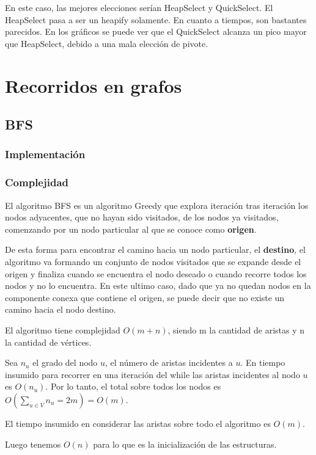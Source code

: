 En este caso, las mejores elecciones serían HeapSelect y QuickSelect. El HeapSelect pasa a ser un heapify solamente. En cuanto a tiempos, son bastantes parecidos. En los gráficos se puede ver que el QuickSelect alcanza un pico mayor que HeapSelect, debido a una mala elección de pivote.

\newpage

\section{Recorridos en grafos}

\subsection{BFS}
\subsubsection{Implementación}

\subsubsection{Complejidad}
El algoritmo BFS es un algoritmo Greedy que explora iteración tras iteración los nodos adyacentes, que no hayan sido visitados, de los nodos ya visitados, comenzando por un nodo particular al que se conoce como \textbf{origen}. 

De esta forma para encontrar el camino hacia un nodo particular, el \textbf{destino}, el algoritmo va formando un conjunto de nodos visitados que se expande desde el origen y finaliza cuando se encuentra el nodo deseado o cuando recorre todos los nodos y no lo encuentra. En este ultimo caso, dado que ya no quedan nodos en la componente conexa que contiene el origen, se puede decir que no existe un camino hacia el nodo destino.

El algoritmo tiene complejidad $O(m + n)$, siendo m la cantidad de aristas y n la cantidad de vértices.

Sea $n_u$ el grado del nodo $u$, el número de aristas incidentes a $u$. En tiempo insumido para recorrer en una iteración del while las aristas incidentes al nodo $u$ es $O(n_u)$.
Por lo tanto, el total sobre todos los nodos es $O(\sum_{u\in V}{} n_u = 2m) = O(m)$.

El tiempo insumido en considerar las aristas sobre todo el algoritmo es $O(m)$.

Luego tenemos $O(n)$ para lo que es la inicialización de las estructuras.


